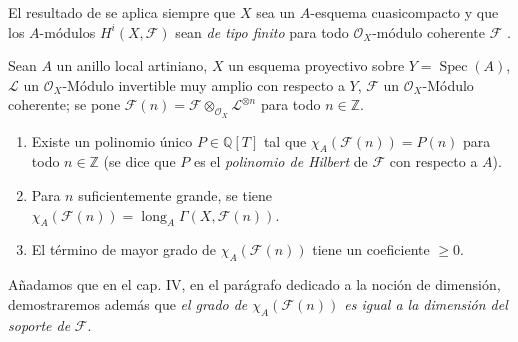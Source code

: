El resultado de  se aplica siempre que $X$ sea un $A$-esquema cuasicompacto y que los $A$-módulos $H^i(X,\mathcal F)$ sean \emph{de tipo finito} para todo $\mathcal O_X$-módulo coherente $\mathcal F$ .

\begin{theorem}[2.5.3]
\label{III.2.5.3-fr}
Sean $A$ un anillo local artiniano, $X$ un esquema proyectivo sobre
$Y=\operatorname{Spec}(A)$, $\mathcal L$ un $\mathcal O_X$-Módulo
invertible muy amplio con respecto a $Y$, $\mathcal F$ un
$\mathcal O_X$-Módulo coherente; se pone
$\mathcal F(n)=\mathcal F\otimes_{\mathcal O_X}\mathcal L^{\otimes n}$
para todo $n\in\mathbb Z$.
\begin{enumerate}
\item[\textup{(i)}] Existe un polinomio único $P\in\mathbb Q[T]$ tal que
$\chi_A(\mathcal F(n))=P(n)$ para todo $n\in\mathbb Z$ \textup{(se dice que $P$
es el \emph{polinomio de Hilbert} de $\mathcal F$ con respecto a $A$)}.
\item[\textup{(ii)}] Para $n$ suficientemente grande, se tiene
$\chi_A(\mathcal F(n))=\operatorname{long}_A
\Gamma(X,\mathcal F(n))$.
\item[\textup{(iii)}] El término de mayor grado de $\chi_A(\mathcal F(n))$ tiene un
coeficiente $\geq0$.
\end{enumerate}
\end{theorem}

Añadamos que en el cap. IV, en el parágrafo dedicado a la noción de
dimensión, demostraremos además que \emph{el grado de
$\chi_A(\mathcal F(n))$ es igual a la dimensión del soporte de}
$\mathcal F$.

